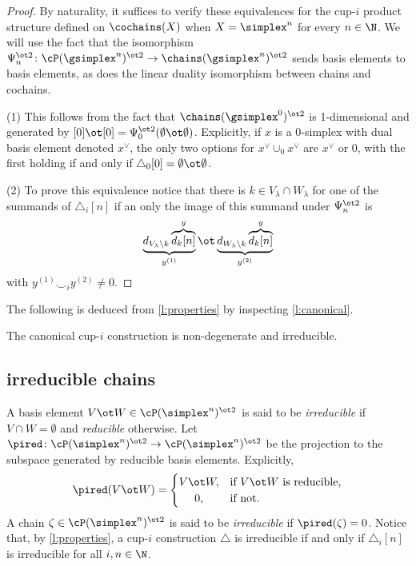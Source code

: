 \begin{proof}
	By naturality, it suffices to verify these equivalences for the \mbox{cup-$i$} product structure defined on $\cochains(X)$ when $X = \simplex^n$ for every $n \in \N$.
	We will use the fact that the isomorphism $\Psi_n^{\ot 2} \colon \cP(\gsimplex^n)^{\ot 2} \to \chains(\gsimplex^n)^{\ot 2}$ sends basis elements to basis elements, as does the linear duality isomorphism between chains and cochains.

	\noindent (1) This follows from the fact that $\chains(\gsimplex^0)^{\ot 2}$ is 1-dimensional and generated by $[0] \ot [0] = \Psi_0^{\ot 2} (\emptyset \ot \emptyset)$.
	Explicitly, if $x$ is a $0$-simplex with dual basis element denoted $x^\vee$, the only two options for $x^\vee \cup_0 x^\vee$ are $x^\vee$ or $0$, with the first holding if and only if $\triangle_0[0] = \emptyset \ot \emptyset$.

	\noindent (2) To prove this equivalence notice that there is $k \in V_\lambda \cap W_\lambda$ for one of the summands of $\triangle_i [n]$ if an only the image of this summand under $\Psi_n^{\ot 2}$ is
	\[
	\underbrace{d_{V_\lambda \setminus k} \overbrace{d_k[n]}^{y}}_{y^{(1)}}
	\ot
	\underbrace{d_{W_\lambda \setminus k} \overbrace{d_k[n]}^{y}}_{y^{(2)}}
	\]
	with $y^{(1)} \smallsmile_i y^{(2)} \neq 0$.
\end{proof}

The following is deduced from \cref{l:properties} by inspecting \cref{l:canonical}.

\begin{theorem}\label{t:existence}
	The canonical \mbox{cup-$i$} construction is non-degenerate and irreducible.
\end{theorem}

\subsection{irreducible chains}

A basis element $V \ot W \in \cP(\simplex^n)^{\ot 2}$ is said to be \textit{irreducible} if $V \cap W = \emptyset$ and \textit{reducible} otherwise.
Let $\pired \colon \cP(\simplex^n)^{\ot 2} \to \cP(\simplex^n)^{\ot 2}$ be the projection to the subspace generated by reducible basis elements.
Explicitly,
\[
\pired(V \ot W) =
\begin{cases}
	V \ot W, & \text{if $V \ot W$ is reducible},\\
	\hfil 0, & \text{if not}.
\end{cases}
\]
A chain $\zeta \in \cP(\simplex^n)^{\ot 2}$ is said to be \textit{irreducible} if $\pired(\zeta) = 0$.
Notice that, by \cref{l:properties}, a cup-$i$ construction $\triangle$ is irreducible if and only if $\triangle_i[n]$ is irreducible
for all $i, n \in \N$.

